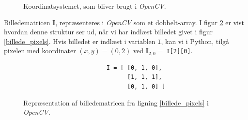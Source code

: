 {\begin{figure}[!b]
\begin{picture}
    \end{picture}
    \caption[]{Koordinatsystemet, som bliver brugt i \emph{OpenCV}.}
    \label{opencv_koordinatsystem}
\end{figure}

Billedematricen $\mathbf{I}$, repræsenteres i \emph{OpenCV} som et
dobbelt-array. I figur \ref{opencv_billedematrix} er vist hvordan
denne struktur ser ud, når vi har indlæst billedet givet i figur
\ref{billede_pixels}. Hvis billedet er indlæst i variablen \texttt{I},
kan vi i Python, tilgå pixelen med koordinater $(x,y) = (0,2)$ ved
$\textbf{I}_{2,0} =~$\texttt{I[2][0]}.

\begin{figure}[t]
    \begin{verbatim}
                        I = [ [0, 1, 0],
                              [1, 1, 1],
                              [0, 1, 0] ]
    \end{verbatim}
\vspace{-2em}
\caption{Repræsentation af billedematricen fra ligning
\ref{billede_pixels} i \emph{OpenCV}.}
\label{opencv_billedematrix}
\end{figure}

}
